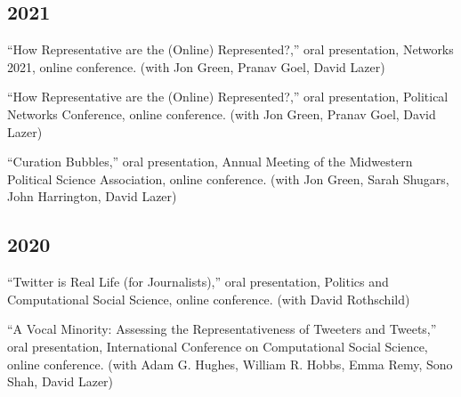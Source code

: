 \documentclass[11pt, letter]{article}
\begin{document}
\subsection{2021}
\begin{hangparas}{.25in}{1}
``How Representative are the (Online) Represented?,'' oral presentation, 
Networks 2021, online conference. (with Jon Green, Pranav
Goel, David Lazer) \vspace{2mm}

``How Representative are the (Online) Represented?,'' oral presentation, 
Political Networks Conference, online conference. (with Jon Green, Pranav
Goel, David Lazer) \vspace{2mm}

``Curation Bubbles,'' oral presentation, Annual Meeting of the Midwestern
Political Science Association, online conference. (with Jon Green, Sarah
Shugars, John Harrington, David Lazer) \vspace{2mm}
\end{hangparas}

\subsection{2020}
\begin{hangparas}{.25in}{1}
``Twitter is Real Life (for Journalists),'' oral presentation, Politics and
Computational Social Science, online conference. (with David
Rothschild) \vspace{2mm}

``A Vocal Minority: Assessing the Representativeness of Tweeters and Tweets,''
oral presentation, International Conference on Computational Social Science,
online conference. (with Adam G. Hughes, William R. Hobbs, Emma Remy, Sono
Shah, David Lazer) \vspace{2mm}
\end{hangparas}
\end{document}
